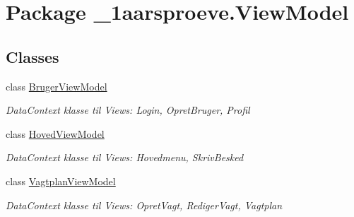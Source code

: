 \hypertarget{namespace__1aarsproeve_1_1_view_model}{}\section{Package \+\_\+1aarsproeve.\+View\+Model}
\label{namespace__1aarsproeve_1_1_view_model}
\subsection*{Classes}
\begin{DoxyCompactItemize}
\item 
class \hyperlink{class__1aarsproeve_1_1_view_model_1_1_bruger_view_model}{Bruger\+View\+Model}
\begin{DoxyCompactList}\small\item\em Data\+Context klasse til Views\+: Login, Opret\+Bruger, Profil \end{DoxyCompactList}\item 
class \hyperlink{class__1aarsproeve_1_1_view_model_1_1_hoved_view_model}{Hoved\+View\+Model}
\begin{DoxyCompactList}\small\item\em Data\+Context klasse til Views\+: Hovedmenu, Skriv\+Besked \end{DoxyCompactList}\item 
class \hyperlink{class__1aarsproeve_1_1_view_model_1_1_vagtplan_view_model}{Vagtplan\+View\+Model}
\begin{DoxyCompactList}\small\item\em Data\+Context klasse til Views\+: Opret\+Vagt, Rediger\+Vagt, Vagtplan \end{DoxyCompactList}\end{DoxyCompactItemize}
